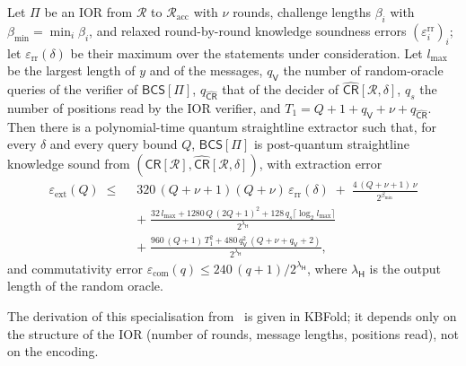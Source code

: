 \begin{theorem}\label{thm:cdhz}
Let $\Pi$ be an IOR from $\mathcal{R}$ to $\mathcal{R}_{\mathrm{acc}}$ with $\nu$ rounds, challenge lengths $\beta_i$ with $\beta_{\min} = \min_i \beta_i$, and relaxed round-by-round knowledge soundness errors $(\varepsilon^{\mathrm{rr}}_i)_i$; let $\varepsilon_{\mathrm{rr}}(\delta)$ be their maximum over the statements under consideration.
Let $l_{\max}$ be the largest length of $y$ and of the messages, $q_{\mathsf{V}}$ the number of random-oracle queries of the verifier of $\mathsf{BCS}[\Pi]$, $q_{\widehat{\mathsf{CR}}}$ that of the decider of $\widehat{\mathsf{CR}}[\mathcal{R},\delta]$, $q_s$ the number of positions read by the IOR verifier, and $T_1 = Q + 1 + q_{\mathsf{V}} + \nu + q_{\widehat{\mathsf{CR}}}$.
Then there is a polynomial-time quantum straightline extractor such that, for every $\delta$ and every query bound $Q$, $\mathsf{BCS}[\Pi]$ is post-quantum straightline knowledge sound from $(\mathsf{CR}[\mathcal{R}], \widehat{\mathsf{CR}}[\mathcal{R},\delta])$, with extraction error
\begin{align*}
  \varepsilon_{\mathrm{ext}}(Q) \;\le\;\;& 320\,(Q+\nu+1)(Q+\nu)\,\varepsilon_{\mathrm{rr}}(\delta) \;+\; \frac{4\,(Q+\nu+1)\,\nu}{2^{\beta_{\min}}} \\
  &+\; \frac{32\, l_{\max} + 1280\, Q\,(2Q+1)^2 + 128\, q_s \lceil \log_2 l_{\max} \rceil}{2^{\lambda_{\mathsf{H}}}} \\
  &+\; \frac{960\,(Q+1)\,T_1^2 + 480\, q_{\mathsf{V}}^2\,(Q + \nu + q_{\mathsf{V}} + 2)}{2^{\lambda_{\mathsf{H}}}},
\end{align*}
and commutativity error $\varepsilon_{\mathrm{com}}(q) \le 240\,(q+1)/2^{\lambda_{\mathsf{H}}}$, where $\lambda_{\mathsf{H}}$ is the output length of the random oracle.
\end{theorem}

The derivation of this specialisation from~\cite{CDHZ25} is given in KBFold; it depends only on the structure of the IOR (number of rounds, message lengths, positions read), not on the encoding.
